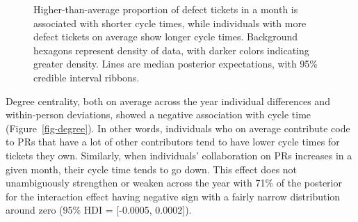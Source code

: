 \documentclass[manuscript,screen,review]{acmart}
\begin{document}
\begin{figure}


\caption[Higher-than-average proportion of defect tickets in a month is
associated with shorter cycle times, while individuals with more defect
tickets on average show longer cycle
times]{\label{fig-defecttickets}Higher-than-average proportion of defect
tickets in a month is associated with shorter cycle times, while
individuals with more defect tickets on average show longer cycle times.
Background hexagons represent density of data, with darker colors
indicating greater density. Lines are median posterior expectations,
with 95\% credible interval ribbons.}

\end{figure}%

Degree centrality, both on average across the year individual
differences and within-person deviations, showed a negative association
with cycle time (Figure~\ref{fig-degree}). In other words, individuals
who on average contribute code to PRs that have a lot of other
contributors tend to have lower cycle times for tickets they own.
Similarly, when individuals' collaboration on PRs increases in a given
month, their cycle time tends to go down. This effect does not
unambiguously strengthen or weaken across the year with 71\% of the
posterior for the interaction effect having negative sign with a fairly
narrow distribution around zero (95\% HDI = {[}-0.0005, 0.0002{]}).
\end{document}
